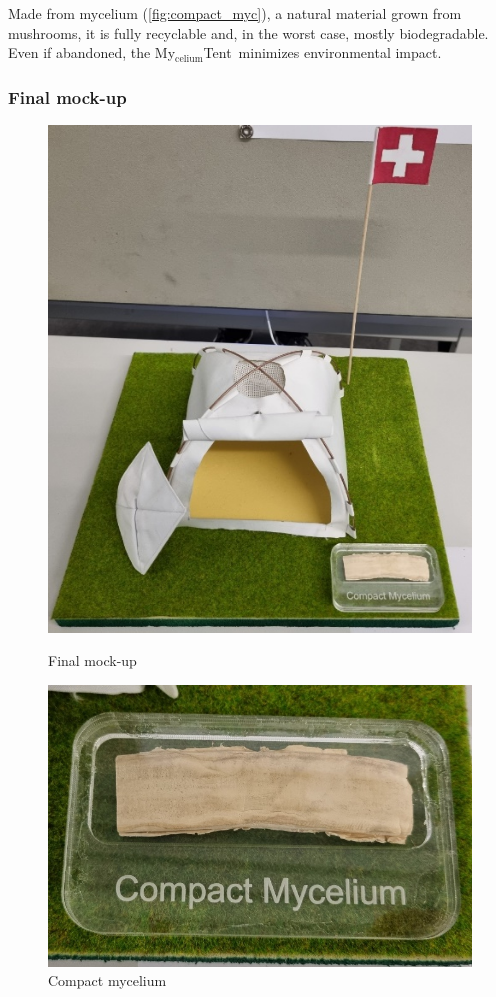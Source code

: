 \documentclass{article}
\newcommand{\myc}{My$_{\text{celium}}$Tent}
\begin{document}
Made from mycelium (\autoref{fig:compact_myc}), a natural material grown from mushrooms,
it is fully recyclable and, in the worst case, mostly biodegradable. Even if abandoned,
the \myc\ minimizes environmental impact.

\newpage
\subsubsection{Final mock-up}
\begin{figure}[ht!]
    \centering
    \begin{minipage}{0.45\textwidth}
        \centering
        \includegraphics[width=.8\textwidth]{media/final_mockup.png}
        \caption{Final mock-up}
        \label{fig:final_mockup}
    \end{minipage}%
    \hfill
    \begin{minipage}{0.45\textwidth}
        \centering
        \includegraphics[width=\textwidth]{media/compact_myc.png}
        \caption{Compact mycelium}
        \label{fig:compact_myc}
    \end{minipage}
\end{figure}
\end{document}
